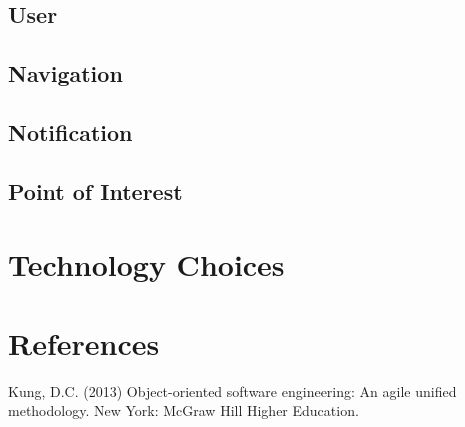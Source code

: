 \documentclass[runningheads,a4paper]{article}
\begin{document}
\subsection {User}

\subsection {Navigation}

\subsection {Notification}

\subsection {Point of Interest}

\section{Technology Choices}

\section{References}
Kung, D.C. (2013) Object-oriented software engineering: An agile unified methodology. New York: McGraw Hill Higher Education.
\end{document}
